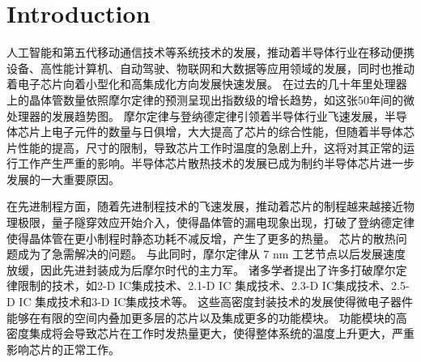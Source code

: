 %
% 
%

\section{Introduction}

人工智能和第五代移动通信技术等系统技术的发展\cite{Lau_2022}，推动着半导体行业在移动便携设备、高性能计算机、自动驾驶、物联网和大数据等应用领域的发展\cite{Lau_2022}，同时也推动着电子芯片向着小型化和高集成化方向发展快速发展\cite{Sadique.Murtaza.ea_2022}。
在过去的几十年里处理器上的晶体管数量依照摩尔定律\cite{Tan.Du.ea_2021}的预测呈现出指数级的增长趋势，如这张50年间的微处理器的发展趋势图。
摩尔定律与登纳德定律\cite{liuyifan.zhangzhiyong_2022}引领着半导体行业飞速发展，半导体芯片上电子元件的数量与日俱增，大大提高了芯片的综合性能，但随着半导体芯片性能的提高，尺寸的限制，导致芯片工作时温度的急剧上升，这将对其正常的运行工作产生严重的影响。半导体芯片散热技术的发展已成为制约半导体芯片进一步发展的一大重要原因。


在先进制程方面，随着先进制程技术的飞速发展，推动着芯片的制程越来越接近物理极限，量子隧穿效应开始介入，使得晶体管的漏电现象出现，打破了登纳德定律使得晶体管在更小制程时静态功耗不减反增，产生了更多的热量。
芯片的散热问题成为了急需解决的问题。
与此同时，摩尔定律从 7 nm 工艺节点以后发展速度放缓，因此先进封装成为后摩尔时代的主力军\cite{WangRuoDa_2022}。
诸多学者提出了许多打破摩尔定律限制的技术，如2-D IC集成技术、2.1-D IC 集成技术\cite{Lau_2023,Chen.Lee.ea_2018,Huang.Hsu.ea_2018}、2.3-D IC集成技术\cite{Zhang.Gan.ea_2023,Lau.Chen.ea_2021}、2.5-D IC 集成技术\cite{Cai.Ma.ea_2018,BhuvanendranNairGourikutty.MengChow.ea_2020,Ding.Liu.ea_2020}和3-D IC集成技术\cite{Ding.Zhang.ea_2021,Huang.He.ea_2021,Marshall.Lee_2022}等。
这些高密度封装技术的发展使得微电子器件能够在有限的空间内叠加更多层的芯片以及集成更多的功能模块。
功能模块的高密度集成将会导致芯片在工作时发热量更大，使得整体系统的温度上升更大，严重影响芯片的正常工作。


